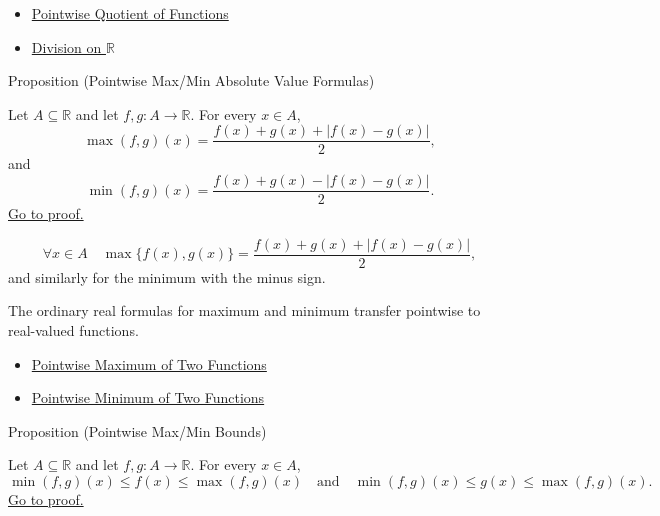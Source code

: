 \begin{dependencies}
\begin{itemize}
  \item \hyperref[def:pointwise-quotient-of-functions]{Pointwise Quotient of Functions}
  \item \hyperref[def:division-on-r]{Division on \(\mathbb{R}\)}
\end{itemize}
\end{dependencies}

\begin{propositionbox}{Proposition (Pointwise Max/Min Absolute Value Formulas)}
\begin{proposition}
\label{prop:pointwise-max-min-absolute-value-formulas}
Let \(A\subseteq\mathbb{R}\) and let \(f,g:A\to\mathbb{R}\).  For every
\(x\in A\),
\[
  \max(f,g)(x)=\frac{f(x)+g(x)+|f(x)-g(x)|}{2},
\]
and
\[
  \min(f,g)(x)=\frac{f(x)+g(x)-|f(x)-g(x)|}{2}.
\]
\hyperref[prf:pointwise-max-min-absolute-value-formulas]{Go to proof.}
\end{proposition}
\end{propositionbox}

\begin{remark*}
\[
  \forall x\in A\quad
  \max\{f(x),g(x)\}
  =
  \frac{f(x)+g(x)+|f(x)-g(x)|}{2},
\]
and similarly for the minimum with the minus sign.
\end{remark*}

\begin{remark*}[Interpretation]
The ordinary real formulas for maximum and minimum transfer pointwise to
real-valued functions.
\end{remark*}

\begin{dependencies}
\begin{itemize}
  \item \hyperref[def:pointwise-maximum-of-two-functions]{Pointwise Maximum of Two Functions}
  \item \hyperref[def:pointwise-minimum-of-two-functions]{Pointwise Minimum of Two Functions}
\end{itemize}
\end{dependencies}

\begin{propositionbox}{Proposition (Pointwise Max/Min Bounds)}
\begin{proposition}
\label{prop:pointwise-max-min-bounds}
Let \(A\subseteq\mathbb{R}\) and let \(f,g:A\to\mathbb{R}\).  For every
\(x\in A\),
\[
  \min(f,g)(x)\leq f(x)\leq \max(f,g)(x)
  \quad\text{and}\quad
  \min(f,g)(x)\leq g(x)\leq \max(f,g)(x).
\]
\hyperref[prf:pointwise-max-min-bounds]{Go to proof.}
\end{proposition}
\end{propositionbox}

